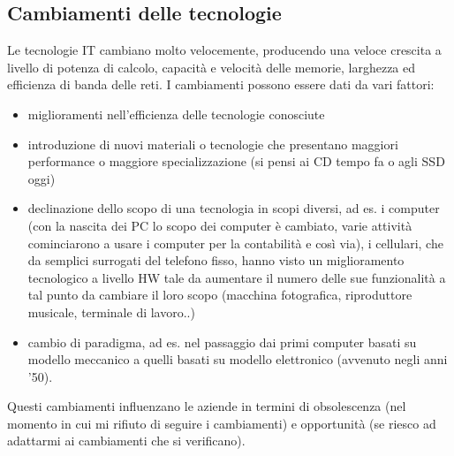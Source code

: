 \subsection{Cambiamenti delle tecnologie}
Le tecnologie IT cambiano molto velocemente, producendo una veloce crescita a livello di potenza di calcolo, capacit\`a e velocit\`a delle memorie, larghezza ed efficienza di banda delle reti.
I cambiamenti possono essere dati da vari fattori:
\begin{itemize}
\item miglioramenti nell'efficienza delle tecnologie conosciute
\item introduzione di nuovi materiali o tecnologie che presentano maggiori performance o maggiore specializzazione (si pensi ai CD tempo fa o agli SSD oggi)
\item declinazione dello scopo di una tecnologia in scopi diversi, ad es. i computer (con la nascita dei PC lo scopo dei computer \`e cambiato, varie attivit\`a cominciarono a usare i computer per la contabilit\`a e cos\`i via), i cellulari, che da semplici surrogati del telefono fisso, hanno visto un miglioramento tecnologico a livello HW tale da aumentare il numero delle sue funzionalit\`a a tal punto da cambiare il loro scopo (macchina fotografica, riproduttore musicale, terminale di lavoro..)
\item cambio di paradigma, ad es. nel passaggio dai primi computer basati su modello meccanico a quelli basati su modello elettronico (avvenuto negli anni '50).
\end{itemize}

Questi cambiamenti influenzano le aziende in termini di obsolescenza (nel momento in cui mi rifiuto di seguire i cambiamenti) e opportunit\`a (se riesco ad adattarmi ai cambiamenti che si verificano).

